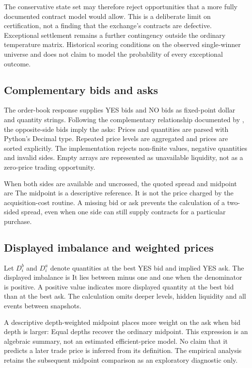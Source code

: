 The conservative state set may therefore reject opportunities that a more fully documented contract model would allow. This is a deliberate limit on certification, not a finding that the exchange's contracts are defective. Exceptional settlement remains a further contingency outside the ordinary temperature matrix. Historical scoring conditions on the observed single-winner universe and does not claim to model the probability of every exceptional outcome.

\subsection{Complementary bids and asks}
The order-book response supplies YES bids and NO bids as fixed-point dollar and quantity strings. Following the complementary relationship documented by , the opposite-side bids imply the asks:
Prices and quantities are parsed with Python's Decimal type. Repeated price levels are aggregated and prices are sorted explicitly. The implementation rejects non-finite values, negative quantities and invalid sides. Empty arrays are represented as unavailable liquidity, not as a zero-price trading opportunity.

When both sides are available and uncrossed, the quoted spread and midpoint are
The midpoint is a descriptive reference. It is not the price charged by the acquisition-cost routine. A missing bid or ask prevents the calculation of a two-sided spread, even when one side can still supply contracts for a particular purchase.

\subsection{Displayed imbalance and weighted prices}
Let $D_i^b$ and $D_i^a$ denote quantities at the best YES bid and implied YES ask. The displayed imbalance is
It lies between minus one and one when the denominator is positive. A positive value indicates more displayed quantity at the best bid than at the best ask. The calculation omits deeper levels, hidden liquidity and all events between snapshots.

A descriptive depth-weighted midpoint places more weight on the ask when bid depth is larger:
Equal depths recover the ordinary midpoint. This expression is an algebraic summary, not an estimated efficient-price model. No claim that it predicts a later trade price is inferred from its definition. The empirical analysis retains the subsequent midpoint comparison as an exploratory diagnostic only.

